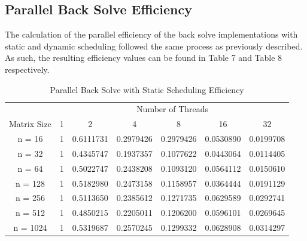 \documentclass{article}
\begin{document}
\subsection{Parallel Back Solve Efficiency}
The calculation of the parallel efficiency of the back solve implementations with static and dynamic scheduling followed the same process as previously described. As such, the resulting efficiency values can be found in Table 7 and Table 8 respectively.

\begin{table}[ht!]
    \caption{Parallel Back Solve with Static Scheduling Efficiency}
    \centering
    \begin{tabular}{|c|c|c|c|c|c|c|}
        \hline
        \multicolumn{1}{|c|}{} & \multicolumn{6}{c|}{Number of Threads} \\
        \cline{2-7}
        \multicolumn{1}{|c|}{Matrix Size} & 1 & 2 & 4 & 8 & 16 & 32 \\
        \hline
        n = 16 & 1 & 0.6111731 & 0.2979426 & 0.2979426 & 0.0530890 & 0.0199708 \\
        \hline
        n = 32 & 1 & 0.4345747 & 0.1937357 & 0.1077622 & 0.0443064 & 0.0114405 \\
        \hline
        n = 64 & 1 & 0.5022747 & 0.2438208 & 0.1093120 & 0.0564112 & 0.0150610 \\
        \hline
        n = 128 & 1 & 0.5182980 & 0.2473158 & 0.1158957 & 0.0364444 & 0.0191129 \\
        \hline
        n = 256 & 1 & 0.5113650 & 0.2385612 & 0.1271735 & 0.0629589 & 0.0292741 \\
        \hline
        n = 512 & 1 & 0.4850215 & 0.2205011 & 0.1206200 & 0.0596101 & 0.0269645 \\
        \hline
        n = 1024 & 1 & 0.5319687 & 0.2570245 & 0.1299332 & 0.0628908 & 0.0314297 \\
        \hline
    \end{tabular}
\end{table}
\end{document}
